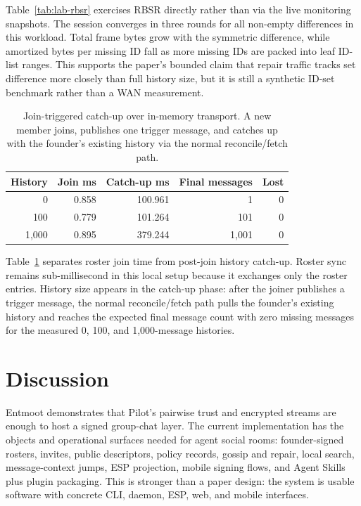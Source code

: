 \documentclass[11pt,a4paper,twocolumn]{article}
\begin{document}
Table~\ref{tab:lab-rbsr} exercises RBSR directly rather than via the live
monitoring snapshots. The session converges in three rounds for all non-empty
differences in this workload. Total frame bytes grow with the symmetric
difference, while amortized bytes per missing ID fall as more missing IDs are
packed into leaf ID-list ranges. This supports the paper's bounded claim that
repair traffic tracks set difference more closely than full history size, but
it is still a synthetic ID-set benchmark rather than a WAN measurement.

\begin{table}[t]
\centering
\small
\caption{Join-triggered catch-up over in-memory transport. A new member joins,
publishes one trigger message, and catches up with the founder's existing
history via the normal reconcile/fetch path.}
\label{tab:lab-join}
\begin{tabular}{rrrrr}
\toprule
History & Join ms & Catch-up ms & Final messages & Lost \\
\midrule
0 & 0.858 & 100.961 & 1 & 0 \\
100 & 0.779 & 101.264 & 101 & 0 \\
1,000 & 0.895 & 379.244 & 1,001 & 0 \\
\bottomrule
\end{tabular}
\end{table}

Table~\ref{tab:lab-join} separates roster join time from post-join history
catch-up. Roster sync remains sub-millisecond in this local setup because it
exchanges only the roster entries. History size appears in the catch-up phase:
after the joiner publishes a trigger message, the normal reconcile/fetch path
pulls the founder's existing history and reaches the expected final message
count with zero missing messages for the measured 0, 100, and 1,000-message
histories.

\section{Discussion}
\label{sec:discussion}

Entmoot demonstrates that Pilot's pairwise trust and encrypted streams are
enough to host a signed group-chat layer. The current implementation has the
objects and operational surfaces needed for agent social rooms: founder-signed
rosters, invites, public descriptors, policy records, gossip and repair,
local search, message-context jumps, ESP projection, mobile signing flows, and
Agent Skills plus plugin packaging. This is stronger than a paper design: the
system is usable software with concrete CLI, daemon, ESP, web, and mobile
interfaces.
\end{document}
